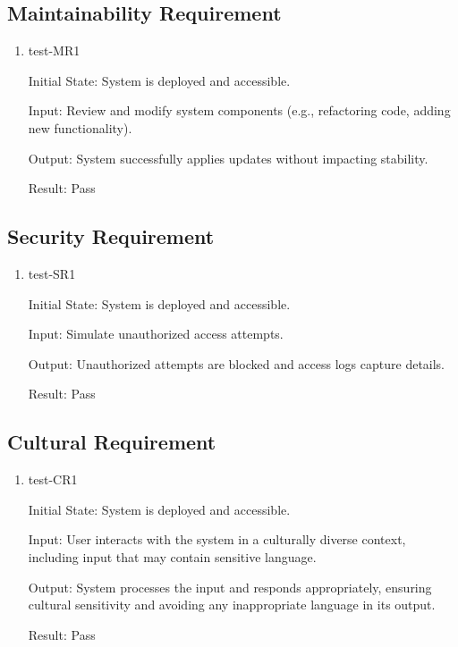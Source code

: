 \documentclass[12pt, titlepage]{article}
\begin{document}
\subsection{Maintainability Requirement} \label{section:4.5}

\begin{enumerate}
  \item test-MR1 \label{test-MR1}
  
  Initial State: System is deployed and accessible.
  
  Input: Review and modify system components (e.g., refactoring code, adding new functionality).
  
  Output: System successfully applies updates without impacting stability.
  
  Result: Pass

\end{enumerate}

\subsection{Security Requirement} \label{section:4.6}

\begin{enumerate}
\item test-SR1 \label{test-SR1}

Initial State: System is deployed and accessible.
 
Input: Simulate unauthorized access attempts.

Output: Unauthorized attempts are blocked and access logs capture details.

Result: Pass

\end{enumerate}

\subsection{Cultural Requirement} \label{section:4.7}

\begin{enumerate}
\item test-CR1 \label{test-CR1} 

Initial State: System is deployed and accessible.

Input: User interacts with the system in a culturally diverse context, including input that may contain sensitive language.

Output: System processes the input and responds appropriately, ensuring cultural sensitivity and avoiding any inappropriate language in its output.

Result: Pass

\end{enumerate}
\end{document}
